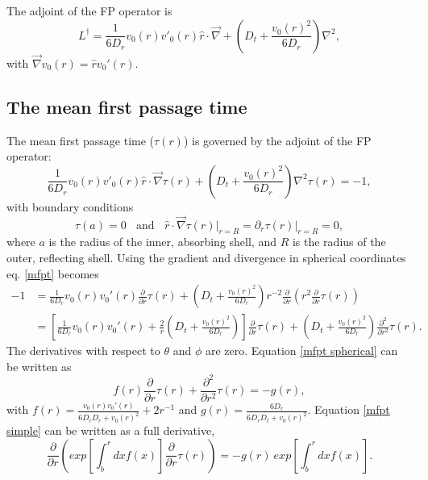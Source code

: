\documentclass[paper=a4, fontsize=11pt]{scrartcl} %
\begin{document}
The adjoint of the FP operator is
\begin{equation}\label{adjoint fpe operator}
\mathit{L}^\dagger = \frac{1}{6D_r} v_0(r) v'_0(r) \hat{r} \cdot \vec \nabla 
+ \left( D_t + \frac{v_0(r)^2}{6D_r} \right) \nabla^2,
\end{equation}
with $\vec{\nabla} v_0(r) = \hat{r}v_0'(r)$.

\subsection*{The mean first passage time}
The mean first passage time ($\tau(r)$) is governed by the adjoint of the FP operator:
\begin{equation}\label{mfpt}
\frac{1}{6D_r} v_0(r) v'_0(r) \hat{r} \cdot \vec \nabla \tau(r)
+ \left( D_t + \frac{v_0(r)^2}{6D_r} \right) \nabla^2 \tau(r) =-1,
\end{equation}
with boundary conditions 
\begin{equation}\label{bc}
\tau(a) = 0 \ \ \ \ \text{and} \ \ \ \  \hat{r} \cdot \vec \nabla \tau(r) \bigg\rvert_{r=R} = \partial_r \tau(r) \bigg\rvert_{r=R} = 0,
\end{equation}
where $a$ is the radius of the inner, absorbing shell, and $R$ is the radius of the outer, reflecting shell.
Using the gradient and divergence in spherical coordinates eq. \ref{mfpt} becomes
\begin{align}\label{mfpt spherical}
-1 &= \frac{1}{6 D_r} v_0(r) v_0'(r) \frac{\partial}{\partial r} \tau(r) + \left( D_t + \frac{v_0(r)^2}{6 D_r} \right) r^{-2} \frac{\partial}{\partial r} \left( r^2 \frac{\partial}{\partial r} \tau(r) \right) \\
& = \left[ \frac{1}{6 D_r} v_0(r) v_0'(r) + \frac{2}{r} \left( D_t + \frac{v_0(r)^2}{6 D_r} \right) \right] \frac{\partial}{\partial r} \tau(r)
+ \left( D_t + \frac{v_0(r)^2}{6 D_r} \right)\frac{\partial^2}{\partial r^2} \tau(r).
\end{align}
The derivatives with respect to $\theta$ and $\phi$ are zero. Equation \ref{mfpt spherical} can be written as
\begin{equation}\label{mfpt simple}
 f(r) \frac{\partial}{\partial r} \tau(r) + \frac{\partial^2}{\partial r^2} \tau(r)=- g(r),
\end{equation}
with $f(r) =  \frac{v_0(r)v_0'(r)}{6D_r D_r + v_0(r)^2}  + 2r^{-1}$ and $g(r) = \frac{6D_r}{6D_r D_t + v_0(r)^2}$.
Equation \ref{mfpt simple} can be written as a full derivative,
\begin{equation}\label{mfpt s1}
\frac{\partial}{\partial r} \left( exp\left[ \int_b^r dx f(x) \right] \frac{\partial}{\partial r} \tau(r) \right) = - g(r)\ exp\left[ \int_b^r dx f(x) \right].
\end{equation}
\end{document}
